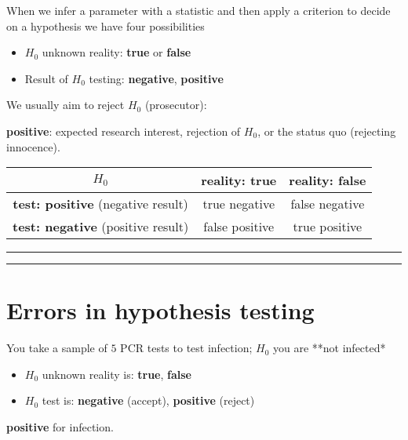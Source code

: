\documentclass[
]{book}
\providecommand{\tightlist}{%
  \setlength{\itemsep}{0pt}\setlength{\parskip}{0pt}}
\begin{document}
When we infer a parameter with a statistic and then apply a criterion to decide on a hypothesis we have four possibilities

\begin{itemize}
\tightlist
\item
  \(H_0\) unknown reality: \textbf{true} or \textbf{false}
\item
  Result of \(H_0\) testing: \textbf{negative}, \textbf{positive}
\end{itemize}

We usually aim to reject \(H_0\) (prosecutor):

\textbf{positive}: expected research interest, rejection of \(H_0\), or the status quo (rejecting innocence).

\begin{longtable}[]{@{}ccc@{}}
\toprule
\(H_0\) & reality: true & reality: false \\
\midrule
\endhead
\textbf{test: positive} (negative result) & true negative & false negative \\
\textbf{test: negative} (positive result) & false positive & true positive \\
\bottomrule
\end{longtable}

\begin{center}\rule{0.5\linewidth}{0.5pt}\end{center}

\begin{center}\rule{0.5\linewidth}{0.5pt}\end{center}

\hypertarget{errors-in-hypothesis-testing-1}{%
\section{Errors in hypothesis testing}\label{errors-in-hypothesis-testing-1}}

You take a sample of \(5\) PCR tests to test infection; \(H_0\) you are **not infected*

\begin{itemize}
\tightlist
\item
  \(H_0\) unknown reality is: \textbf{true}, \textbf{false}
\item
  \(H_0\) test is: \textbf{negative} (accept), \textbf{positive} (reject)
\end{itemize}

\textbf{positive} for infection.
\end{document}
